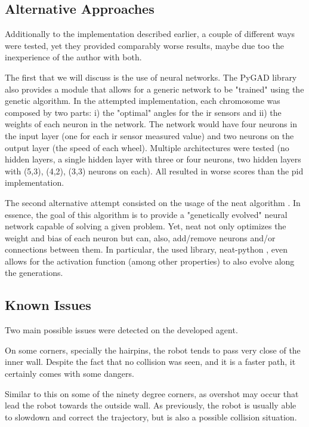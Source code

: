 \documentclass[runningheads]{llncs}
\begin{document}
\subsection{Alternative Approaches}

Additionally to the implementation described earlier, a couple of different ways were tested, yet they provided comparably worse results, maybe due too the inexperience of the author with both.

The first that we will discuss is the use of neural networks. The PyGAD library also provides a module that allows for a generic network to be "trained" using the genetic algorithm. In the attempted implementation, each chromosome was composed by two parts: i) the "optimal" angles for the \gls{ir} sensors and ii) the weights of each neuron in the network. The network would have four neurons in the input layer (one for each \gls{ir} sensor measured value) and two neurons on the output layer (the speed of each wheel). Multiple architectures were tested (no hidden layers, a single hidden layer with three or four neurons, two hidden layers with (5,3), (4,2), (3,3) neurons on each). All resulted in worse scores than the \gls{pid} implementation.

The second alternative attempt consisted on the usage of the \gls{neat} algorithm \cite{stanley:ec02}. In essence, the goal of this algorithm is to provide a "genetically evolved" neural network capable of solving a given problem. Yet, \gls{neat} not only optimizes the weight and bias of each neuron but can, also, add/remove neurons and/or connections between them. In particular, the used library, neat-python \cite{neat_python}, even allows for the activation function (among other properties) to also evolve along the generations.

\subsection{Known Issues}

Two main possible issues were detected on the developed agent.

On some corners, specially the hairpins, the robot tends to pass very close of the inner wall. Despite the fact that no collision was seen, and it is a faster path, it certainly comes with some dangers.

Similar to this on some of the ninety degree corners, as overshot may occur that lead the robot towards the outside wall. As previously, the robot is usually able to slowdown and correct the trajectory, but is also a possible collision situation.
\end{document}
